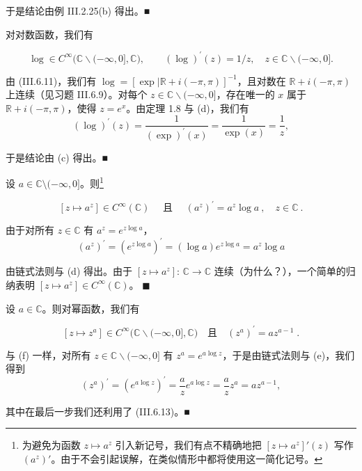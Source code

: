 \begin{example}
\begin{items}
于是结论由例 III.2.25(b) 得出。■

\item

对对数函数，我们有

\[
\operatorname{l o g}\in C^{\infty}\bigl(\mathbb{C}\backslash(-\infty,0],\mathbb{C}\bigr),\qquad(\operatorname{l o g})^{\prime}(z)=1/z,\quad z\in\mathbb{C}\backslash(-\infty,0].
\]

\proofhead
由 (III.6.11)，我们有 $ \log = [\exp |\mathbb{R} + i(-\pi,\pi)]^{-1} $，且对数在 $ \mathbb{R} + i(-\pi,\pi) $ 上连续（见习题 III.6.9）。对每个 $ z \in \mathbb{C}\backslash(-\infty,0] $，存在唯一的 $ x $ 属于 $ \mathbb{R} + i(-\pi,\pi) $，使得 $ z = e^x $。由定理 1.8 与 (d)，我们有
\[
(\log)^{\prime}(z)=\frac{1}{(\exp)^{\prime}(x)}=\frac{1}{\exp(x)}=\frac{1}{z},
\]

于是结论由 (c) 得出。■

\item

设 $ a \in \mathbb{C} \setminus (-\infty, 0] $。则\footnote{为避免为函数 $ z \mapsto a^z $ 引入新记号，我们有点不精确地把 $ [z \mapsto a^z]'(z) $ 写作 $ (a^z)' $。由于不会引起误解，在类似情形中都将使用这一简化记号。}

\[
[z\mapsto a^{z}]\in C^{\infty}(\mathbb{C})\quad\text{ 且 }\quad(a^{z})^{\prime}=a^{z}\log a~,\quad z\in\mathbb{C}~.
\]

\proofhead
由于对所有 $ z \in \mathbb{C} $ 有 $ a^z = e^{z\log a} $，
\[
(a^{z})^{\prime}=(e^{z\log a})^{\prime}=(\log a)e^{z\log a}=a^{z}\log a
\]

由链式法则与 (d) 得出。由于 $ [z \mapsto a^z] $: $ \mathbb{C} \to \mathbb{C} $ 连续（为什么？），一个简单的归纳表明 $ [z \mapsto a^z] \in C^\infty(\mathbb{C}) $。 $ \blacksquare $

\item

设 $ a \in \mathbb{C} $。则对幂函数，我们有

\[
[z\mapsto z^{a}]\in C^{\infty}\bigl(\mathbb{C}\backslash(-\infty,0],\mathbb{C}\bigr)\quad\text{且}\quad(z^{a})^{\prime}=a z^{a-1}\;.
\]

\proofhead
与 (f) 一样，对所有 $ z \in \mathbb{C}\backslash(-\infty,0] $ 有 $ z^a = e^{a \log z} $，于是由链式法则与 (e)，我们得到
\[
(z^{a})^{\prime}=(e^{a\log z})^{\prime}=\frac{a}{z}e^{a\log z}=\frac{a}{z}z^{a}=a z^{a-1},
\]

其中在最后一步我们还利用了 (III.6.13)。■

\item


\end{items}
\end{example}
